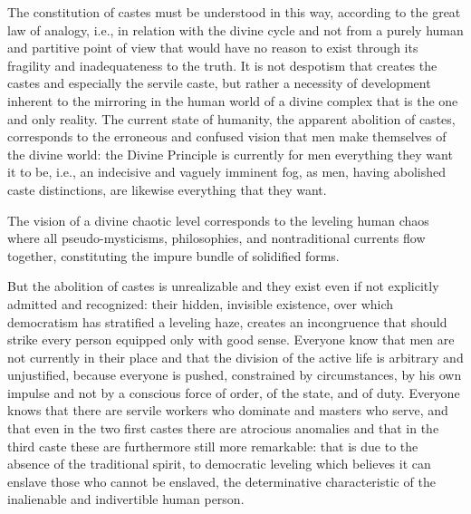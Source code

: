The constitution of castes must be understood in this way, according to the great law of analogy, i.e., in relation with the divine cycle and not from a purely human and partitive point of view that would have no reason to exist through its fragility and inadequateness to the truth. It is not despotism that creates the castes and especially the servile caste, but rather a necessity of development inherent to the mirroring in the human world of a divine complex that is the one and only reality. The current state of humanity, the apparent abolition of castes, corresponds to the erroneous and confused vision that men make themselves of the divine world: the Divine Principle is currently for men everything they want it to be, i.e., an indecisive and vaguely imminent fog, as men, having abolished caste distinctions, are likewise everything that they want.

The vision of a divine chaotic level corresponds to the leveling human chaos where all pseudo-mysticisms, philosophies, and nontraditional currents flow together, constituting the impure bundle of solidified forms.

But the abolition of castes is unrealizable and they exist even if not explicitly admitted and recognized: their hidden, invisible existence, over which democratism has stratified a leveling haze, creates an incongruence that should strike every person equipped only with good sense. Everyone know that men are not currently in their place and that the division of the active life is arbitrary and unjustified, because everyone is pushed, constrained by circumstances, by his own impulse and not by a conscious force of order, of the state, and of duty. Everyone knows that there are servile workers who dominate and masters who serve, and that even in the two first castes there are atrocious anomalies and that in the third caste these are furthermore still more remarkable: that is due to the absence of the traditional spirit, to democratic leveling which believes it can enslave those who cannot be enslaved, the determinative characteristic of the inalienable and indivertible human person.

